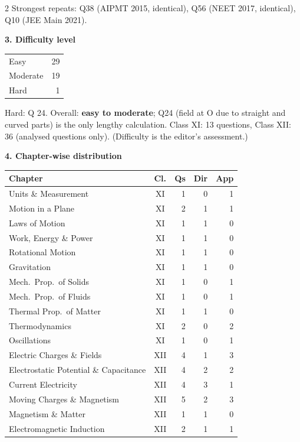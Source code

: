 \begin{multicols}{2}
{\footnotesize Strongest repeats: Q38 (AIPMT 2015, identical), Q56 (NEET 2017, identical), Q10 (JEE Main 2021).}\par\medskip
\textbf{\color{crimson}3. Difficulty level}\par\smallskip
\begin{tabular}{@{}lr@{}}\toprule
Easy & 29\\ Moderate & 19\\ Hard & 1\\\bottomrule\end{tabular}\par\smallskip
{\footnotesize Hard: Q 24. Overall: \textbf{easy to moderate}; Q24 (field at O due to straight and curved parts) is the only lengthy calculation. Class XI: 13 questions, Class XII: 36 (analysed questions only). (Difficulty is the editor's assessment.)}\par\medskip
\columnbreak
\textbf{\color{crimson}4. Chapter-wise distribution}\par\smallskip
{\footnotesize\begin{tabular}{@{}p{4.7cm}c@{\,}r@{\,}r@{\,}r@{}}\toprule
Chapter & Cl. & Qs & Dir & App\\\midrule
Units \& Measurement & XI & 1 & 0 & 1\\
Motion in a Plane & XI & 2 & 1 & 1\\
Laws of Motion & XI & 1 & 1 & 0\\
Work, Energy \& Power & XI & 1 & 1 & 0\\
Rotational Motion & XI & 1 & 1 & 0\\
Gravitation & XI & 1 & 1 & 0\\
Mech.\ Prop.\ of Solids & XI & 1 & 0 & 1\\
Mech.\ Prop.\ of Fluids & XI & 1 & 0 & 1\\
Thermal Prop.\ of Matter & XI & 1 & 1 & 0\\
Thermodynamics & XI & 2 & 0 & 2\\
Oscillations & XI & 1 & 0 & 1\\
Electric Charges \& Fields & XII & 4 & 1 & 3\\
Electrostatic Potential \& Capacitance & XII & 4 & 2 & 2\\
Current Electricity & XII & 4 & 3 & 1\\
Moving Charges \& Magnetism & XII & 5 & 2 & 3\\
Magnetism \& Matter & XII & 1 & 1 & 0\\
Electromagnetic Induction & XII & 2 & 1 & 1\\

\end{tabular}}
\end{multicols}
